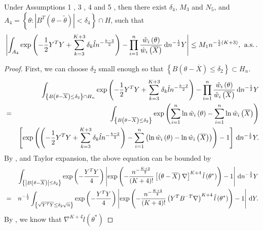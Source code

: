 \begin{lemma}
\label{lem:central-expansion-lik-2} Under  Assumptions 1 , 3 , 4 and 5 , then there exist $\delta_{4}$, $M_{3}$
and $N_{5}$, 
and $ A_4=\left\{ \theta:\left|B^T\left(\theta-\tilde{\theta}\right)\right|<\delta_{4}\right\} \cap H $,
 such that 
\[
\left|\int_{A_4}\exp\left(-\frac{1}{2}Y^{T}Y+\sum_{k=3}^{K+3}\delta_{k}\hat{l}n^{-\frac{k-2}{2}}\right)-\prod_{i=1}^{n}\frac{\hat{w}_{i}\left(\theta\right)}{\hat{w}_{i}\left(\overline{X}\right)}\,\mathrm{d} n^{-\frac{1}{2}}Y\right|\le M_{1}n^{-\frac{1}{2}\left(K+3\right)},\:\,\mathrm{a.s.}\,.
\]
\end{lemma}
\begin{proof}
First, we can choose $\delta_{2}$ small enough so that $\left\{ B\left(\theta-\overline{X}\right)\le\delta_{2}\right\} \subset H_{n}$.
\begin{eqnarray*}
 &  & \int_{\left\{ B\left(\theta-\overline{X}\right)\le\delta_{2}\right\} \cap H_{n}}\exp\left(-\frac{1}{2}Y^{T}Y+\sum_{k=3}^{K+3}\delta_{k}\hat{l}n^{-\frac{k-2}{2}}\right)-\prod_{i=1}^{n}\frac{\hat{w}_{i}\left(\theta\right)}{\hat{w}_{i}\left(\overline{X}\right)}\,\mathrm{d} n^{-\frac{1}{2}}Y\\
 & = & \int_{\left\{ B\left(\theta-\overline{X}\right)\le\delta_{2}\right\} }\exp\left(\sum_{i=1}^{n}\ln\hat{w}_{i}\left(\theta\right)-\sum_{i=1}^{n}\ln\hat{w}_{i}\left(\overline{X}\right)\right)\\
 &  & \left[\exp\left(\left(-\frac{1}{2}Y^{T}Y+\sum_{k=3}^{K+3}\delta_{k}\hat{l}n^{-\frac{k-2}{2}}\right)-\sum_{i=1}^{n}\left(\ln\hat{w}_{i}\left(\theta\right)-\ln\hat{w}_{i}\left(\overline{X}\right)\right)\right)-1\right]\,\mathrm{d} n^{-\frac{1}{2}}Y.
\end{eqnarray*}
By , and Taylor expansion, the
above equation can be bounded by 
\begin{eqnarray*}
 &  & \int_{\left\{ \left|B\left(\theta-\overline{X}\right)\right|\le\delta_{2}\right\} }\exp\left(-\frac{Y^{T}Y}{4}\right)\left|\exp\left(-\frac{n^{-\frac{K+2}{2}}}{\left(K+4\right)!}\left[\left(\theta-\overline{X}\right)\nabla\right]^{K+4}\hat{l}\left(\theta^{*}\right)\right)-1\right|\,\mathrm{d} n^{-\frac{1}{2}}Y\\
 & = & n^{-\frac{1}{2}}\int_{\left\{ \sqrt{Y^{T}Y}\le\delta_{2}\sqrt{n}\right\} }\exp\left(-\frac{Y^{T}Y}{4}\right)\left|\exp\left(-\frac{n^{-\frac{K+2}{2}}}{\left(K+4\right)!}\left(Y^{T}B^{-T}\nabla\right)^{K+4}\hat{l}\left(\theta^{*}\right)\right)-1\right|\,\mathrm{d} Y.
\end{eqnarray*}
By , we know that $\nabla^{K+4}\hat{l}\left(\theta^{*}\right)$

\end{proof}
